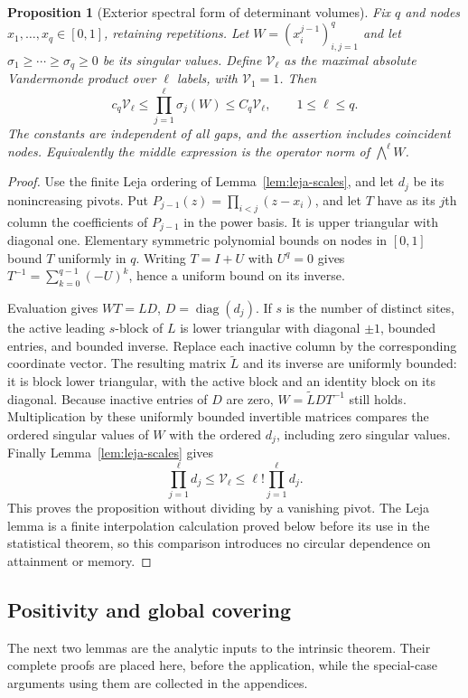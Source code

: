 \documentclass[11pt]{amsart}
\newtheorem{proposition}[theorem]{Proposition}
\theoremstyle{definition}\newtheorem{definition}[theorem]{Definition}
\theoremstyle{remark}\newtheorem{remark}[theorem]{Remark}
\begin{document}
\begin{proposition}[Exterior spectral form of determinant volumes]
\label{prop:exterior-profile}
Fix $q$ and nodes $x_1,\ldots,x_q\in[0,1]$, retaining repetitions.
Let $W=(x_i^{j-1})_{i,j=1}^q$ and let
$\sigma_1\ge\cdots\ge\sigma_q\ge0$ be its singular values. Define
$\mathcal V_\ell$ as the maximal absolute Vandermonde product over
$\ell$ labels, with $\mathcal V_1=1$. Then
\[
 c_q\mathcal V_\ell\le\prod_{j=1}^\ell\sigma_j(W)
                         \le C_q\mathcal V_\ell,
 \qquad 1\le\ell\le q.
\]
The constants are independent of all gaps, and the assertion includes
coincident nodes. Equivalently the middle expression is the operator
norm of $\bigwedge^\ell W$.
\end{proposition}
\begin{proof}
Use the finite Leja ordering of Lemma~\ref{lem:leja-scales}, and let
$d_j$ be its nonincreasing pivots. Put
$P_{j-1}(z)=\prod_{i<j}(z-x_i)$, and let $T$ have as its $j$th
column the coefficients of $P_{j-1}$ in the power basis. It is upper
triangular with diagonal one. Elementary symmetric polynomial bounds
on nodes in $[0,1]$ bound $T$ uniformly in $q$. Writing $T=I+U$
with $U^q=0$ gives $T^{-1}=\sum_{k=0}^{q-1}(-U)^k$, hence a uniform
bound on its inverse.

Evaluation gives $WT=LD$, $D=\operatorname{diag}(d_j)$. If $s$ is
the number of distinct sites, the active leading $s$-block of $L$ is
lower triangular with diagonal $\pm1$, bounded entries, and bounded
inverse. Replace each inactive column by the corresponding coordinate
vector. The resulting matrix $\widetilde L$ and its inverse are
uniformly bounded: it is block lower triangular, with the active block
and an identity block on its diagonal. Because inactive entries of $D$
are zero, $W=\widetilde LDT^{-1}$ still holds.
Multiplication by these uniformly bounded invertible matrices compares
the ordered singular values of $W$ with the ordered $d_j$, including
zero singular values. Finally Lemma~\ref{lem:leja-scales} gives
\[
 \prod_{j=1}^\ell d_j\le\mathcal V_\ell
                    \le\ell!\prod_{j=1}^\ell d_j.
\]
This proves the proposition without dividing by a vanishing pivot.
The Leja lemma is a finite interpolation calculation proved below before
its use in the statistical theorem, so this comparison introduces no
circular dependence on attainment or memory.
\end{proof}

\subsection{Positivity and global covering}
The next two lemmas are the analytic inputs to the intrinsic theorem.
Their complete proofs are placed here, before the application, while the
special-case arguments using them are collected in the appendices.
\end{document}
